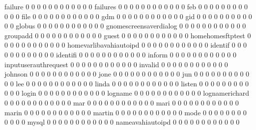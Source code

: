 \documentclass[compress,8pt]{beamer}
\begin{document}
\begin{frame}
\begin{Schunk}
  failure                                   0  0  0  0  0  0  0  0  0  0  0  0
  failures                                  0  0  0  0  0  0  0  0  0  0  0  0
  feb                                       0  0  0  0  0  0  0  0  0  0  0  0
  file                                      0  0  0  0  0  0  0  0  0  0  0  0
  gdm                                       0  0  0  0  0  0  0  0  0  0  0  0
  gid                                       0  0  0  0  0  0  0  0  0  0  0  0
  globus                                    0  0  0  0  0  0  0  0  0  0  0  0
  gnomescreensaverdialog                    0  0  0  0  0  0  0  0  0  0  0  0
  groupadd                                  0  0  0  0  0  0  0  0  0  0  0  0
  guest                                     0  0  0  0  0  0  0  0  0  0  0  0
  homehomesftptest                          0  0  0  0  0  0  0  0  0  0  0  0
  homevarlibavahiautoipd                    0  0  0  0  0  0  0  0  0  0  0  0
  identif                                   0  0  0  0  0  0  0  0  0  0  0  0
  identifi                                  0  0  0  0  0  0  0  0  0  0  0  0
  inform                                    0  0  0  0  0  0  0  0  0  0  0  0
  inputuserauthrequest                      0  0  0  0  0  0  0  0  0  0  0  0
  invalid                                   0  0  0  0  0  0  0  0  0  0  0  0
  johnson                                   0  0  0  0  0  0  0  0  0  0  0  0
  jone                                      0  0  0  0  0  0  0  0  0  0  0  0
  jun                                       0  0  0  0  0  0  0  0  0  0  0  0
  lee                                       0  0  0  0  0  0  0  0  0  0  0  0
  linda                                     0  0  0  0  0  0  0  0  0  0  0  0
  listen                                    0  0  0  0  0  0  0  0  0  0  0  0
  login                                     0  0  0  0  0  0  0  0  0  0  0  0
  logname                                   0  0  0  0  0  0  0  0  0  0  0  0
  lognamerichard                            0  0  0  0  0  0  0  0  0  0  0  0
  mar                                       0  0  0  0  0  0  0  0  0  0  0  0
  mari                                      0  0  0  0  0  0  0  0  0  0  0  0
  marin                                     0  0  0  0  0  0  0  0  0  0  0  0
  martin                                    0  0  0  0  0  0  0  0  0  0  0  0
  mode                                      0  0  0  0  0  0  0  0  0  0  0  0
  mysql                                     0  0  0  0  0  0  0  0  0  0  0  0
  nameavahiautoipd                          0  0  0  0  0  0  0  0  0  0  0  0

\end{Schunk}
\end{frame}
\end{document}
